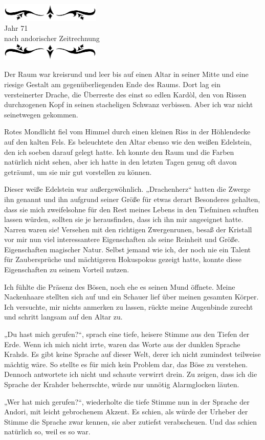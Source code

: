 \documentclass[10pt, a4paper, oneside]{book}
\newcommand{\az}[1]{%
    \begin{center}
        \includegraphics[width=180px]{Das Erbe des Wunderkindes/verzierung1.png}\\
        {\Huge #1} \\
        {nach andorischer Zeitrechnung}\\
        \includegraphics[width=180px]{Das Erbe des Wunderkindes/verzierung2.png}
    \end{center}
    \extramarks{}{#1 a.Z.}
}
\begin{document}
\az{Jahr 71}

Der Raum war kreisrund und leer bis auf einen Altar in seiner Mitte und eine riesige Gestalt am gegenüberliegenden Ende des Raums. Dort lag ein versteinerter Drache, die Überreste des einst so edlen Kardòl, den von Rissen durchzogenen Kopf in seinen stacheligen Schwanz verbissen. Aber ich war nicht seinetwegen gekommen.

Rotes Mondlicht fiel vom Himmel durch einen kleinen Riss in der Höhlendecke auf den kalten Fels. Es beleuchtete den Altar ebenso wie den weißen Edelstein, den ich soeben darauf gelegt hatte. Ich konnte den Raum und die Farben natürlich nicht sehen, aber ich hatte in den letzten Tagen genug oft davon geträumt, um sie mir gut vorstellen zu können.

Dieser weiße Edelstein war außergewöhnlich. „Drachenherz“ hatten die Zwerge ihn genannt und ihn aufgrund seiner Größe für etwas derart Besonderes gehalten, dass sie mich zweifelsohne für den Rest meines Lebens in den Tiefminen schuften lassen würden, sollten sie je herausfinden, dass ich ihn mir angeeignet hatte. Narren waren sie! Versehen mit den richtigen Zwergenrunen, besaß der Kristall vor mir nun viel interessantere Eigenschaften als seine Reinheit und Größe. Eigenschaften magischer Natur. Selbst jemand wie ich, der noch nie ein Talent für Zaubersprüche und mächtigeren Hokuspokus gezeigt hatte, konnte diese Eigenschaften zu seinem Vorteil nutzen.

Ich fühlte die Präsenz des Bösen, noch ehe es seinen Mund öffnete. Meine Nackenhaare stellten sich auf und ein Schauer lief über meinen gesamten Körper. Ich versuchte, mir nichts anmerken zu lassen, rückte meine Augenbinde zurecht und schritt langsam auf den Altar zu.

„Du hast mich gerufen?“, sprach eine tiefe, heisere Stimme aus den Tiefen der Erde. Wenn ich mich nicht irrte, waren das Worte aus der dunklen Sprache Krahds. Es gibt keine Sprache auf dieser Welt, derer ich nicht zumindest teilweise mächtig wäre. So stellte es für mich kein Problem dar, das Böse zu verstehen. Dennoch antwortete ich nicht und schaute verwirrt drein. Zu zeigen, dass ich die Sprache der Krahder beherrschte, würde nur unnötig Alarmglocken läuten.

„Wer hat mich gerufen?“, wiederholte die tiefe Stimme nun in der Sprache der Andori, mit leicht gebrochenem Akzent. Es schien, als würde der Urheber der Stimme die Sprache zwar kennen, sie aber zutiefst verabscheuen. Und das schien natürlich so, weil es so war.
\end{document}
